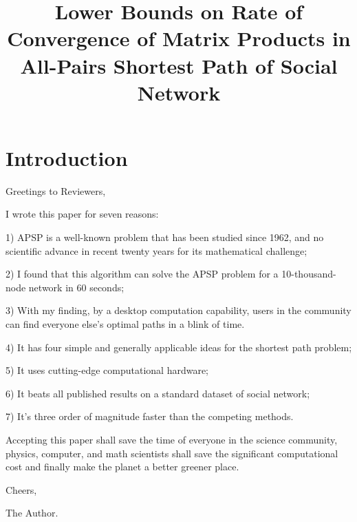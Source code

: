\documentclass[10pt,twocolumn,letterpaper]{article}
\begin{document}
\title{Lower Bounds on Rate of Convergence of Matrix Products in All-Pairs Shortest Path of Social Network}  %

\maketitle
\thispagestyle{empty}


\section{Introduction}


Greetings to Reviewers,

I wrote this paper for seven reasons:

1) APSP is a well-known problem that has been studied since 1962, and no scientific advance in recent twenty years for its mathematical challenge;

2) I found that this algorithm can solve the APSP problem for a 10-thousand-node network in 60 seconds;

3) With my finding, by a desktop computation capability, users in the community can find everyone else's optimal paths in a blink of time.

4) It has four simple and generally applicable ideas for the shortest path problem;

5) It uses cutting-edge computational hardware;

6) It beats all published results on a standard dataset of social network;

7) It's three order of magnitude faster than the competing methods.

Accepting this paper shall save the time of everyone in the science community, physics, computer, and math scientists shall save the significant computational cost and finally make the planet a better greener place.


Cheers,

The Author.

{\small

%
}
\end{document}
